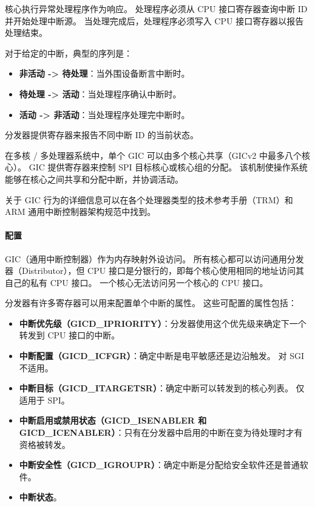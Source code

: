 核心执行异常处理程序作为响应。
处理程序必须从 CPU 接口寄存器查询中断 ID 并开始处理中断源。
当处理完成后，处理程序必须写入 CPU 接口寄存器以报告处理结束。

对于给定的中断，典型的序列是：

\begin{itemize}
\item
  \textbf{非活动 -\textgreater{} 待处理}：当外围设备断言中断时。
\item
  \textbf{待处理 -\textgreater{} 活动}：当处理程序确认中断时。
\item
  \textbf{活动 -\textgreater{} 非活动}：当处理程序处理完中断时。
\end{itemize}

分发器提供寄存器来报告不同中断 ID 的当前状态。

在多核 / 多处理器系统中，单个 GIC 可以由多个核心共享（GICv2 中最多八个核心）。
GIC 提供寄存器来控制 SPI 目标核心或核心组的分配。
该机制使操作系统能够在核心之间共享和分配中断，并协调活动。

关于 GIC 行为的详细信息可以在各个处理器类型的技术参考手册（TRM）和 ARM 通用中断控制器架构规范中找到。

\paragraph*{配置}

GIC（通用中断控制器）作为内存映射外设访问。
所有核心都可以访问通用分发器（Distributor），但 CPU 接口是分银行的，即每个核心使用相同的地址访问其自己的私有 CPU 接口。
一个核心无法访问另一个核心的 CPU 接口。

分发器有许多寄存器可以用来配置单个中断的属性。
这些可配置的属性包括：

\begin{itemize}
\item
  \textbf{中断优先级（GICD\_IPRIORITY）}：分发器使用这个优先级来确定下一个转发到 CPU 接口的中断。
\item
  \textbf{中断配置（GICD\_ICFGR）}：确定中断是电平敏感还是边沿触发。
  对  SGI 不适用。
\item
  \textbf{中断目标（GICD\_ITARGETSR）}：确定中断可以转发到的核心列表。
  仅适用于 SPI。
\item
  \textbf{中断启用或禁用状态（GICD\_ISENABLER 和 GICD\_ICENABLER）}：只有在分发器中启用的中断在变为待处理时才有资格被转发。
\item
  \textbf{中断安全性（GICD\_IGROUPR）}：确定中断是分配给安全软件还是普通软件。
\item
  \textbf{中断状态}。
\end{itemize}

